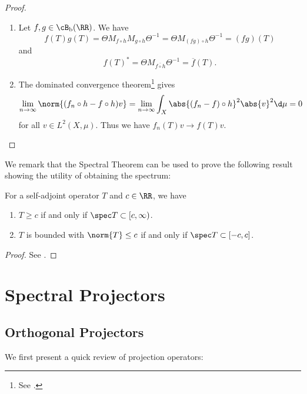 \documentclass[oneside,reqno,letterpaper]{amsart}
\begin{document}
\begin{proof}~
  \begin{enumerate}[label=(\alph*)]
  \item %
    Let \(f, g \in \cB_{\mathrm{b}}(\RR)\). 
    We have
    \[
      f(T) g(T)
      = \Theta M_{f \circ h} M_{g \circ h} \Theta^{-1} 
      = \Theta M_{(fg) \circ h} \Theta^{-1} 
      = (fg) (T) 
    \] 
    and 
    \[
      f(T)^* 
      = \Theta M_{\overline{f \circ h}} \Theta^{-1} 
      = \overline{f}(T) . 
    \] 
  \item %
    The dominated convergence theorem\footnote{See \cite[p.~55]{bass2014real}. } gives
    \[
      \lim_{n \to \infty} \norm{(f_{n} \circ h - f \circ h) v} 
      = \lim_{n \to \infty} \int_{X} \abs{(f_{n} - f) \circ h}^2 \abs{v}^2 \d\mu
      = 0
    \] 
    for all \(v \in L^2(X, \mu)\). 
    Thus we have \(f_{n}(T)v \to f(T)v\). 
  \end{enumerate}
\end{proof}

We remark that the Spectral Theorem can be used to prove the following result showing the utility of obtaining the spectrum:
\begin{theorem}
  For a self-adjoint operator \(T\) and \(c \in \RR\), we have 
  \begin{enumerate}[label=(\alph*)]
    \item \(T \geq c\) if and only if \(\spec T \subset [c, \infty)\).
    \item \(T\) is bounded with \(\norm{T} \leq c\) if and only if \(\spec T \subset [-c, c]\). 
  \end{enumerate}
\end{theorem}
\begin{proof}
  See \cite[p.~68]{pankrashkin2022spectral}. 
\end{proof}





\section{Spectral Projectors}
\label{sec:spectral-projectors}

\subsection{Orthogonal Projectors}
We first present a quick review of projection operators:
\end{document}
